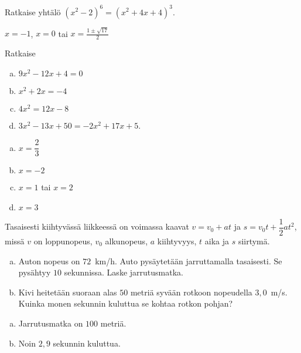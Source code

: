 \begin{tehtavasivu}
\begin{tehtava} %
	Ratkaise yhtälö $(x^2-2)^6=(x^2+4x+4)^3$.
	\begin{vastaus}
		$x=-1$, $x=0$ tai $x=\frac{1 \pm \sqrt{17}}{2}$
	\end{vastaus}
\end{tehtava}

\begin{tehtava}
    Ratkaise
    \begin{enumerate}[a)]
        \item $9x^2 - 12x + 4 = 0$
        \item $x^2 + 2x = -4$
        \item $4x^2 = 12x - 8$
        \item $3x^2 - 13x + 50 = -2x^2 + 17x + 5$.
    \end{enumerate}
    \begin{vastaus}
        \begin{enumerate}[a)]
            \item $x = \dfrac{2}{3}$
            \item $x = -2$
            \item $x = 1$ tai $x = 2$
            \item $x = 3$
        \end{enumerate}
    \end{vastaus}
\end{tehtava}

\begin{tehtava}
    Tasaisesti kiihtyvässä liikkeessä on voimassa kaavat $v = v_0 + at$ ja $s = v_0t + \dfrac{1}{2}at^2$, missä $v$ on loppunopeus, $v_0$ alkunopeus, $a$ kiihtyvyys, $t$ aika ja $s$ siirtymä.
		\begin{enumerate}[a)]
            \item Auton nopeus on $72$~km/h. Auto pysäytetään jarruttamalla tasaisesti. Se pysähtyy $10$ sekunnissa. Laske jarrutusmatka.
            \item Kivi heitetään suoraan alas $50$ metriä syvään rotkoon nopeudella $3,0$~m/s. Kuinka monen sekunnin kuluttua se kohtaa rotkon pohjan?
        \end{enumerate}
    \begin{vastaus}
        \begin{enumerate}[a)]
            \item Jarrutusmatka on $100$ metriä.
            \item Noin $2,9$ sekunnin kuluttua.
        \end{enumerate}
    \end{vastaus}
\end{tehtava}


\end{tehtavasivu}
